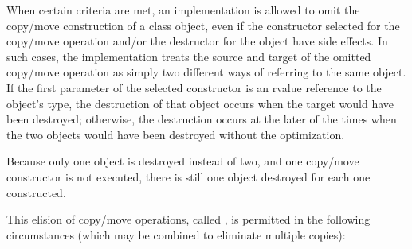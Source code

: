 \pnum
{}%
%
%
%
%
When certain criteria are met, an implementation is
allowed to omit the copy/move construction of a class object,
even if the constructor selected for the copy/move operation and/or the
destructor for the object have
%
side effects.  In such cases, the
implementation treats the source and target of the
omitted copy/move operation as simply two different ways of
referring to the same object. If the first parameter of the
selected constructor is an rvalue reference to the object's type,
the destruction of that object occurs when the target would have been destroyed;
otherwise, the destruction occurs at the later of the times when the
two objects would have been destroyed without the
optimization.
\begin{footnote}
Because only one object is destroyed instead of two,
and one copy/move constructor
is not executed, there is still one object destroyed for each one constructed.
\end{footnote}
This elision of copy/move operations, called
%
%
,
is permitted in the
following circumstances (which may be combined to
eliminate multiple copies):
